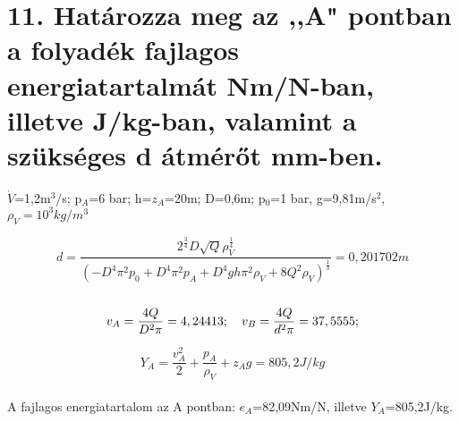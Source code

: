 \section*{11. Határozza meg az ,,A" pontban a folyadék fajlagos energiatartalmát Nm/N-ban, illetve J/kg-ban, valamint a szükséges d átmérőt mm-ben.} 
$\dot{V}$=1,2m$^3$/s; p$_A$=6 bar; h=$z_A$=20m; D=0,6m; p$_0$=1 bar, g=9,81m/s$^2$, $\rho_V=10^3kg/m^3$

$$
d=\frac{2^{\frac{3}{4}}D\sqrt{Q}\rho_V^{\frac{1}{4}}}{(-D^4\pi^2p_0+D^4\pi^2p_A+D^4gh\pi^2\rho_V+8Q^2\rho_V)^{\frac{1}{3}}}=0,201702m
$$
\\
$$
v_A=\frac{4Q}{D^2\pi}=4,24413 ; \hspace*{10pt} v_B=\frac{4Q}{d^2\pi}=37,5555;
$$

$$
Y_A=\frac{v_A^2}{2}+\frac{p_A}{\rho_V}+z_Ag=805,2 J/kg
$$
\\
A fajlagos energiatartalom az A pontban: $e_A$=82,09Nm/N, illetve $Y_A$=805,2J/kg.